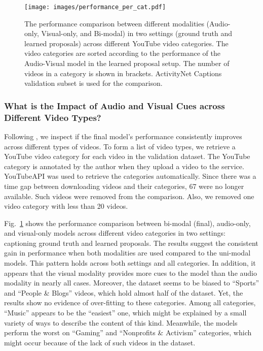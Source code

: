 \documentclass{src/bmvc2k}
\begin{document}
\begin{figure}
\begin{center}
\texttt{[image: images/performance\_per\_cat.pdf]}
\end{center}
\vspace{-1em}
\caption{The performance comparison between different modalities (Audio-only, Visual-only, and Bi-modal) in two settings (ground truth and learned proposals) across different YouTube video categories. The video categories are sorted according to the performance of the Audio-Visual model in the learned proposal setup. The number of videos in a category is shown in brackets. ActivityNet Captions validation subset is used for the comparison. \label{fig:performance_per_cat}}
\end{figure}

\subsubsection{What is the Impact of Audio and Visual Cues across Different Video Types?\label{sec:diff_cats}}

Following \cite{mdvc_Iashin_2020}, we inspect if the final model's performance consistently improves across different types of videos. To form a list of video types, we retrieve a YouTube video category for each video in the validation dataset. The YouTube category is annotated by the author when they upload a video to the service. YouTubeAPI \cite{YouTubeVideoCategories} was used to retrieve the categories automatically. Since there was a time gap between downloading videos and their categories, 67 were no longer available. Such videos were removed from the comparison. Also, we removed one video category with less than 20 videos.

Fig.~\ref{fig:performance_per_cat} shows the performance comparison between bi-modal (final), audio-only, and visual-only models across different video categories in two settings: captioning ground truth and learned proposals. The results suggest the consistent gain in performance when both modalities are used compared to the uni-modal models. This pattern holds across both settings and all categories. In addition, it appears that the visual modality provides more cues to the model than the audio modality in nearly all cases. Moreover, the dataset seems to be biased to ``Sports'' and ``People \& Blogs'' videos, which hold almost half of the dataset. Yet, the results show no evidence of over-fitting to these categories. Among all categories, ``Music'' appears to be the ``easiest'' one, which might be explained by a small variety of ways to describe the content of this kind. Meanwhile, the models perform the worst on ``Gaming'' and ``Nonprofits \& Activism'' categories, which might occur because of the lack of such videos in the dataset.
\end{document}
